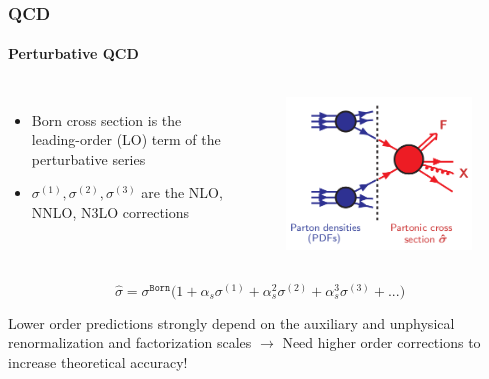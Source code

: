 \documentclass[aspectratio=43]{beamer}
\begin{document}
\begin{frame}

	\frametitle{QCD}
	\framesubtitle{Perturbative QCD}
	
	\begin{columns}
		
		
		\begin{itemize}
			\item Born cross section is the leading-order (LO) term of the perturbative series
			\item $\sigma^{(1)}, \sigma^{(2)}, \sigma^{(3)}$ are the NLO, NNLO, N3LO corrections
		\end{itemize}
		
		\begin{figure}[!htb]
			\includegraphics[width = 5 cm]{plots/factorization_3.png}
		\end{figure}
	
	\end{columns}
	
	\begin{equation}
		\hat{\sigma} = \sigma^{\texttt{Born}} \Big( 1 +
		\alpha_{s} \sigma^{(1)} + 
		\alpha_{s}^{2} \sigma^{(2)} + 
		\alpha_{s}^{3} \sigma^{(3)} + ... \Big) \nonumber
	\end{equation}
	
	Lower order predictions strongly depend on the auxiliary and unphysical renormalization and factorization scales $\longrightarrow$ {\color{red}Need higher order corrections to increase theoretical accuracy!}

\end{frame}

\begin{frame}


\end{frame}

\begin{frame}


\end{frame}
\end{document}
